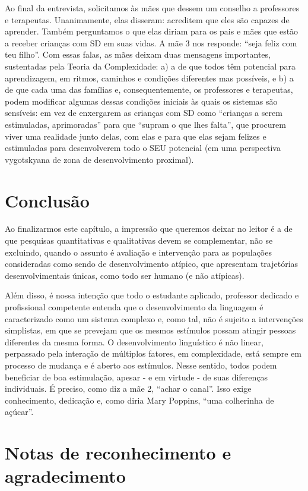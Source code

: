\documentclass[output=paper,colorlinks,citecolor=brown,booklanguage=portuguese]{langscibook}
\begin{document}
Ao final da entrevista, solicitamos às mães que dessem um conselho a professores e terapeutas. Unanimamente, elas disseram: acreditem que eles são capazes de aprender. Também perguntamos o que elas diriam para os pais e mães que estão a receber crianças com SD em suas vidas. A mãe 3 nos responde: “seja feliz com teu filho”. Com essas falas, as mães deixam duas mensagens importantes, sustentadas pela Teoria da Complexidade: a) a de que todos têm potencial para aprendizagem, em ritmos, caminhos e condições diferentes mas possíveis, e b) a de que cada uma das famílias e, consequentemente, os professores e terapeutas, podem modificar algumas dessas condições iniciais às quais os sistemas são sensíveis: em vez de enxergarem as crianças com SD como “crianças a serem estimuladas, aprimoradas” para que “supram o que lhes falta”, que procurem viver uma realidade junto delas, com elas e para que elas sejam felizes e estimuladas para desenvolverem todo o SEU potencial (em uma perspectiva vygotskyana de zona de desenvolvimento proximal).

\section{Conclusão}

Ao finalizarmos este capítulo, a impressão que queremos deixar no leitor é a de que pesquisas quantitativas e qualitativas devem se complementar, não se excluindo, quando o assunto é avaliação e intervenção para as populações consideradas como sendo de desenvolvimento atípico, que apresentam trajetórias desenvolvimentais únicas, como todo ser humano (e não atípicas).

Além disso, é nossa intenção que todo o estudante aplicado, professor dedicado e profissional competente entenda que o desenvolvimento da linguagem é caracterizado como um sistema complexo e, como tal, não é sujeito a intervenções simplistas, em que se prevejam que os mesmos estímulos possam atingir pessoas diferentes da mesma forma. O desenvolvimento linguístico é não linear, perpassado pela interação de múltiplos fatores, em complexidade, está sempre em processo de mudança e é aberto aos estímulos. Nesse sentido, todos podem beneficiar de boa estimulação, apesar - e em virtude - de suas diferenças individuais. É preciso, como diz a mãe 2, “achar o canal”. Isso exige conhecimento, dedicação e, como diria Mary Poppins, “uma colherinha de açúcar”.

\section*{Notas de reconhecimento e agradecimento}
\end{document}
